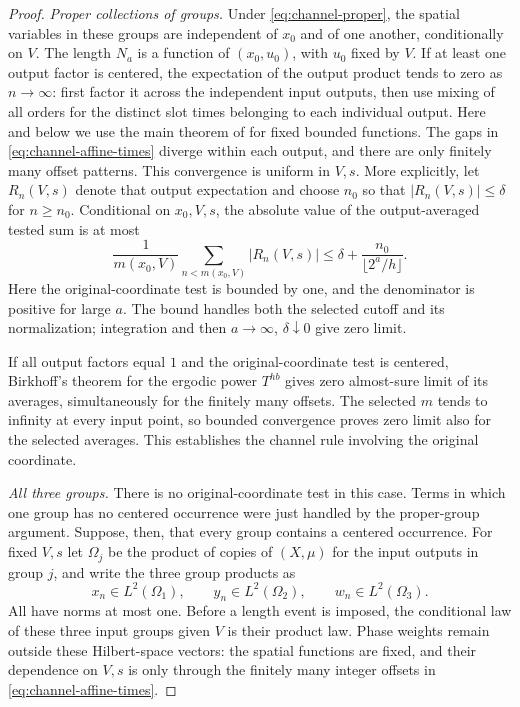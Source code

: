 \begin{proof}
\emph{Proper collections of groups.}
Under \eqref{eq:channel-proper}, the spatial variables in these groups
are independent of $x_0$ and of one another, conditionally on $V$.
The length $N_a$ is a function of $(x_0,u_0)$, with $u_0$ fixed by $V$.
If at least one output factor is centered, the expectation of the
output product tends to zero as $n\to\infty$: first factor it across
the independent input outputs, then use mixing of all orders for the
distinct slot times belonging to each individual output.  Here and
below we use the main theorem of \cite{MixingCompanion} for fixed
bounded functions.  The gaps
in \eqref{eq:channel-affine-times} diverge within each output, and
there are only finitely many offset patterns.  This convergence is
uniform in $V,s$.  More explicitly, let $R_n(V,s)$ denote that output
expectation and choose $n_0$ so that $|R_n(V,s)|\le\delta$ for
$n\ge n_0$.  Conditional on $x_0,V,s$, the absolute value of the
output-averaged tested sum is at most
\[
 \frac1{m(x_0,V)}\sum_{n<m(x_0,V)}|R_n(V,s)|
       \le\delta+\frac{n_0}{\lfloor2^a/h\rfloor}.
\]
Here the original-coordinate test is bounded by one, and the
denominator is positive for large $a$.  The bound handles both the
selected cutoff and its normalization; integration and then
$a\to\infty$, $\delta\downarrow0$ give zero limit.

If all output factors equal $1$ and the original-coordinate test is
centered, Birkhoff's theorem for the ergodic power $T^{hb}$ gives
zero almost-sure limit of its averages, simultaneously for the
finitely many offsets.  The selected $m$ tends to infinity at every
input point, so bounded convergence proves zero limit also for the
selected averages.  This establishes the channel rule involving
the original coordinate.

\emph{All three groups.}
There is no original-coordinate test in this case.  Terms in which
one group has no centered occurrence were just handled by the
proper-group argument.  Suppose, then, that every group contains a
centered occurrence.  For fixed $V,s$ let $\Omega_j$ be the product
of copies of $(X,\mu)$ for the input outputs in group $j$, and write
the three group products as
\[
 x_n\in L^2(\Omega_1),\qquad
 y_n\in L^2(\Omega_2),\qquad
 w_n\in L^2(\Omega_3).
\]
All have norms at most one.  Before a length event is imposed, the
conditional law of these three input groups given $V$ is their
product law.  Phase weights remain outside these Hilbert-space vectors:
the spatial functions are fixed, and their dependence on $V,s$ is only
through the finitely many integer offsets in
\eqref{eq:channel-affine-times}.


\end{proof}

